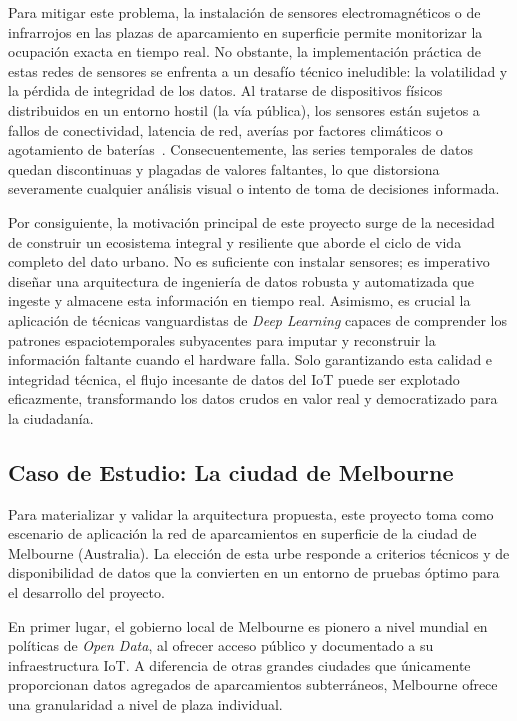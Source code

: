 Para mitigar este problema, la instalación de sensores electromagnéticos o de infrarrojos en las plazas de aparcamiento en superficie permite monitorizar la ocupación exacta en tiempo real. No obstante, la implementación práctica de estas redes de sensores se enfrenta a un desafío técnico ineludible: la volatilidad y la pérdida de integridad de los datos. Al tratarse de dispositivos físicos distribuidos en un entorno hostil (la vía pública), los sensores están sujetos a fallos de conectividad, latencia de red, averías por factores climáticos o agotamiento de baterías~\cite{algaradi2020survey}. Consecuentemente, las series temporales de datos quedan discontinuas y plagadas de valores faltantes, lo que distorsiona severamente cualquier análisis visual o intento de toma de decisiones informada.

Por consiguiente, la motivación principal de este proyecto surge de la necesidad de construir un ecosistema integral y resiliente que aborde el ciclo de vida completo del dato urbano. No es suficiente con instalar sensores; es imperativo diseñar una arquitectura de ingeniería de datos robusta y automatizada que ingeste y almacene esta información en tiempo real. Asimismo, es crucial la aplicación de técnicas vanguardistas de \textit{Deep Learning} capaces de comprender los patrones espaciotemporales subyacentes para imputar y reconstruir la información faltante cuando el hardware falla. Solo garantizando esta calidad e integridad técnica, el flujo incesante de datos del IoT puede ser explotado eficazmente, transformando los datos crudos en valor real y democratizado para la ciudadanía.

\subsection{Caso de Estudio: La ciudad de Melbourne}
\label{subsec:caso_estudio}

Para materializar y validar la arquitectura propuesta, este proyecto toma como escenario de aplicación la red de aparcamientos en superficie de la ciudad de Melbourne (Australia). La elección de esta urbe responde a criterios técnicos y de disponibilidad de datos que la convierten en un entorno de pruebas óptimo para el desarrollo del proyecto.

En primer lugar, el gobierno local de Melbourne es pionero a nivel mundial en políticas de \textit{Open Data}, al ofrecer acceso público y documentado a su infraestructura IoT. A diferencia de otras grandes ciudades que únicamente proporcionan datos agregados de aparcamientos subterráneos, Melbourne ofrece una granularidad a nivel de plaza individual.

